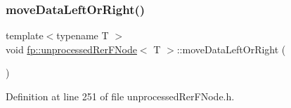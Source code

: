 \mbox{\label{classfp_1_1unprocessedRerFNode_a6b0103f44984a79d6a0871d3e1866b34}} 
\subsubsection{\texorpdfstring{move\+Data\+Left\+Or\+Right()}{moveDataLeftOrRight()}}
{\footnotesize\ttfamily template$<$typename T $>$ \\
void \hyperlink{classfp_1_1unprocessedRerFNode}{fp\+::unprocessed\+Rer\+F\+Node}$<$ T $>$\+::move\+Data\+Left\+Or\+Right (\begin{DoxyParamCaption}{ }\end{DoxyParamCaption})\hspace{0.3cm}{\ttfamily [inline]}}



Definition at line 251 of file unprocessed\+Rer\+F\+Node.\+h.


